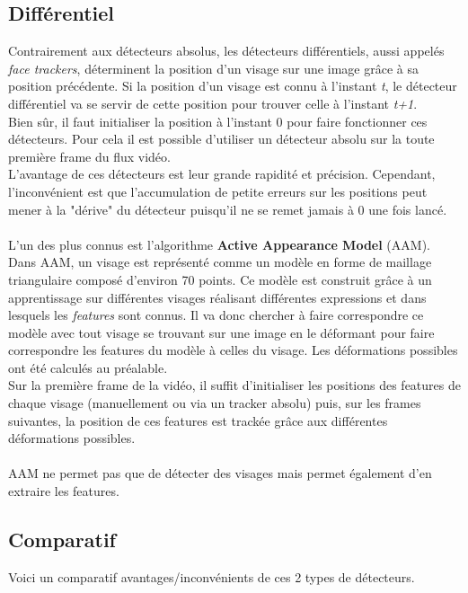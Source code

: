 \documentclass[overfullbox, poster]{polytech/polytech}
\begin{document}
\subsection{Différentiel}
Contrairement aux détecteurs absolus, les détecteurs différentiels, aussi appelés \textit{face trackers}, déterminent la position d'un visage sur une image grâce à sa position précédente. Si la position d'un visage est connu à l'instant \textit{t}, le détecteur différentiel va se servir de cette position pour trouver celle à l'instant \textit{t+1}.\\
Bien sûr, il faut initialiser la position à l'instant 0 pour faire fonctionner ces détecteurs. Pour cela il est possible d'utiliser un détecteur absolu sur la toute première frame du flux vidéo.\\
L'avantage de ces détecteurs est leur grande rapidité et précision. Cependant, l'inconvénient est que l'accumulation de petite erreurs sur les positions peut mener à la "dérive" du détecteur puisqu'il ne se remet jamais à 0 une fois lancé.\\
\\
L'un des plus connus est l'algorithme \textbf{Active Appearance Model} (AAM).\\
Dans AAM, un visage est représenté comme un modèle en forme de maillage triangulaire composé d'environ
70 points. Ce modèle est construit grâce à un apprentissage sur différentes visages réalisant différentes expressions et dans lesquels les \textit{features} sont connus. Il va donc chercher à faire correspondre ce modèle avec tout visage se trouvant sur une image en le déformant pour faire correspondre les features du modèle à celles du visage. Les déformations possibles ont été calculés au préalable.\\
Sur la première frame de la vidéo, il suffit d'initialiser les positions des features de chaque visage (manuellement ou via un tracker absolu) puis, sur les frames suivantes, la position de ces features est trackée grâce aux différentes déformations possibles.\\
\\
AAM ne permet pas que de détecter des visages mais permet également d'en extraire les features.

\subsection{Comparatif}
Voici un comparatif avantages/inconvénients de ces 2 types de détecteurs.
\end{document}
